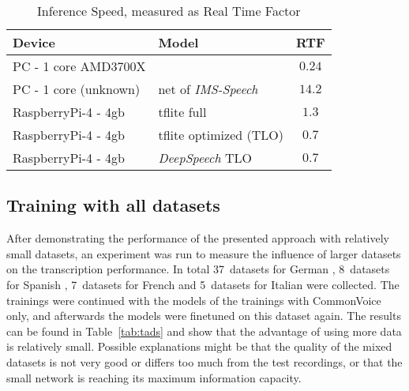 \begin{table}[H]
	\caption{Inference Speed, measured as Real Time Factor}
	\label{tab:insp}
	\centering
	\begin{tabular}{llc}
		\toprule
		\textbf{Device} & \textbf{Model} & \textbf{RTF} \\
		\midrule
		PC - 1 core AMD3700X &  & $0.24$ \\
		PC - 1 core (unknown) & net of \textit{IMS-Speech} \cite{IMSDE} & $14.2$ \\
		\midrule
		RaspberryPi-4 - 4gb & tflite full & $1.3$ \\
		RaspberryPi-4 - 4gb & tflite optimized (TLO) & $0.7$ \\
		RaspberryPi-4 - 4gb & \textit{DeepSpeech} TLO & $0.7$ \\
		\bottomrule
	\end{tabular}
\end{table}

\subsection{Training with all datasets}

After demonstrating the performance of the presented approach with relatively small datasets, an experiment was run to measure the influence of larger datasets on the transcription performance.
In total 37~datasets for German \cite{VOXF,TUDA,COMV,FRMT,SPRIN,CSS10,GOTH,KURZG,LINGL,MUWI,MALBS,PULSR,SWC,TATO,TERAX,YKOLL,ZAMSP,ALC,BROTH,HMPL,PHATT,PD1,RVG1,RVGJ,SC10,SHC,SI100,SMC,VM1,VM2,WASEP,ZIPTEL,TORST,GLD2,SKYRM,WIT3,MTEDX}, 8~datasets for Spanish \cite{VOXF,COMV,CSS10,LINGL,MALBS,TATO,MTEDX,LVES}, 7~datasets for French \cite{VOXF,COMV,CSS10,LINGL,MALBS,TATO,MTEDX} and 5~datasets for Italian \cite{VOXF,COMV,LINGL,MALBS,MTEDX} were collected. The trainings were continued with the models of the trainings with CommonVoice only, and afterwards the models were finetuned on this dataset again. The results can be found in Table~\ref{tab:tads} and show that the advantage of using more data is relatively small. Possible explanations might be that the quality of the mixed datasets is not very good or differs too much from the test recordings, or that the small network is reaching its maximum information capacity.

